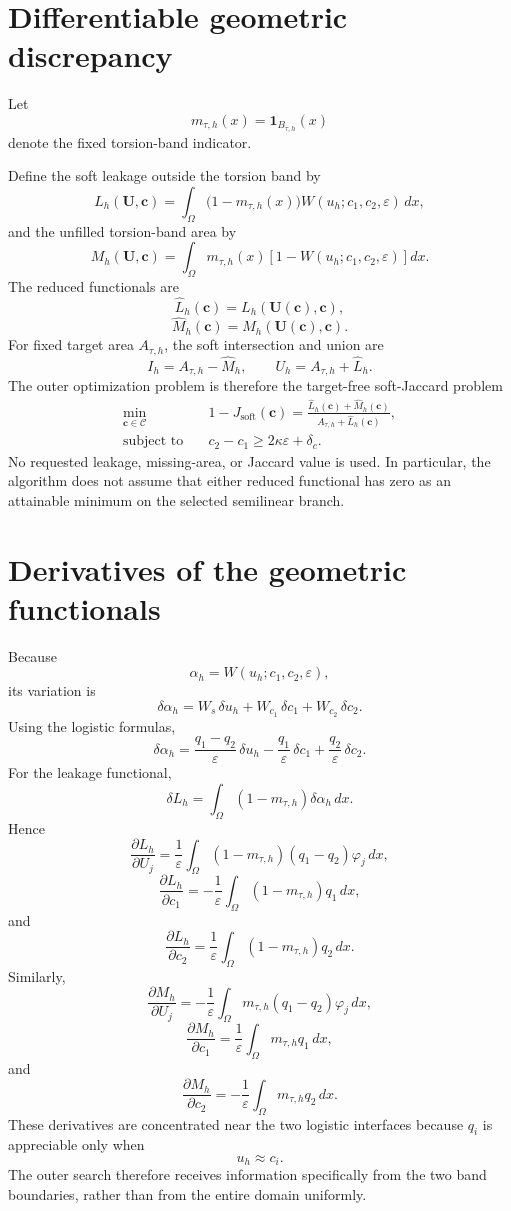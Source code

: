 \documentclass[11pt]{article}
\newcommand{\cC}{\mathcal{C}}
\newcommand{\bU}{\mathbf{U}}
\newcommand{\bc}{\mathbf{c}}
\begin{document}
\section{Differentiable geometric discrepancy}

Let
\[
m_{\tau,h}(x)=\mathbf{1}_{B_{\tau,h}}(x)
\]
denote the fixed torsion-band indicator.

Define the soft leakage outside the torsion band by
\[
L_h(\bU,\bc)
=
\int_\Omega
\bigl(1-m_{\tau,h}(x)\bigr)
W(u_h;c_1,c_2,\varepsilon)\,dx,
\]
and the unfilled torsion-band area by
\[
M_h(\bU,\bc)
=
\int_\Omega
m_{\tau,h}(x)
\left[
1-W(u_h;c_1,c_2,\varepsilon)
\right]dx.
\]
The reduced functionals are
\[
\widehat L_h(\bc)
=
L_h(\bU(\bc),\bc),
\]
\[
\widehat M_h(\bc)
=
M_h(\bU(\bc),\bc).
\]
For fixed target area $A_{\tau,h}$, the soft intersection and union are
\[
I_h=A_{\tau,h}-\widehat M_h,
\qquad
U_h=A_{\tau,h}+\widehat L_h.
\]
The outer optimization problem is therefore the target-free soft-Jaccard
problem
\[
\boxed{
\begin{aligned}
\min_{\bc\in\cC}\quad&
1-J_{\mathrm{soft}}(\bc)
=
\frac{\widehat L_h(\bc)+\widehat M_h(\bc)}
{A_{\tau,h}+\widehat L_h(\bc)},
\\
\text{subject to}\quad&
c_2-c_1
\geq
2\kappa\varepsilon+\delta_c.
\end{aligned}}
\]
No requested leakage, missing-area, or Jaccard value is used.  In particular,
the algorithm does not assume that either reduced functional has zero as an
attainable minimum on the selected semilinear branch.

\section{Derivatives of the geometric functionals}

Because
\[
\alpha_h=W(u_h;c_1,c_2,\varepsilon),
\]
its variation is
\[
\delta\alpha_h
=
W_s\,\delta u_h
+
W_{c_1}\,\delta c_1
+
W_{c_2}\,\delta c_2.
\]
Using the logistic formulas,
\[
\delta\alpha_h
=
\frac{q_1-q_2}{\varepsilon}\,\delta u_h
-
\frac{q_1}{\varepsilon}\,\delta c_1
+
\frac{q_2}{\varepsilon}\,\delta c_2.
\]
For the leakage functional,
\[
\delta L_h
=
\int_\Omega
(1-m_{\tau,h})
\delta\alpha_h\,dx.
\]
Hence
\[
\frac{\partial L_h}{\partial U_j}
=
\frac{1}{\varepsilon}
\int_\Omega
(1-m_{\tau,h})(q_1-q_2)\varphi_j\,dx,
\]
\[
\frac{\partial L_h}{\partial c_1}
=
-\frac{1}{\varepsilon}
\int_\Omega
(1-m_{\tau,h})q_1\,dx,
\]
and
\[
\frac{\partial L_h}{\partial c_2}
=
\frac{1}{\varepsilon}
\int_\Omega
(1-m_{\tau,h})q_2\,dx.
\]
Similarly,
\[
\frac{\partial M_h}{\partial U_j}
=
-\frac{1}{\varepsilon}
\int_\Omega
m_{\tau,h}(q_1-q_2)\varphi_j\,dx,
\]
\[
\frac{\partial M_h}{\partial c_1}
=
\frac{1}{\varepsilon}
\int_\Omega
m_{\tau,h}q_1\,dx,
\]
and
\[
\frac{\partial M_h}{\partial c_2}
=
-\frac{1}{\varepsilon}
\int_\Omega
m_{\tau,h}q_2\,dx.
\]
These derivatives are concentrated near the two logistic interfaces because $q_i$ is appreciable only when
\[
u_h\approx c_i.
\]
The outer search therefore receives information specifically from the two band boundaries, rather than from the entire domain uniformly.
\end{document}
